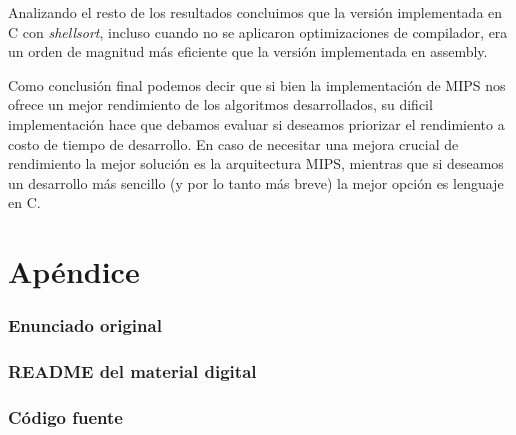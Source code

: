 \documentclass[a4paper,11pt]{article}
\begin{document}
Analizando el resto de los resultados concluimos que la versión implementada en
C con \textit{shellsort}, incluso cuando no se aplicaron optimizaciones de
compilador, era un orden de magnitud más eficiente que la versión implementada
en assembly. 

Como conclusión final podemos decir que si bien la implementación de MIPS nos ofrece un mejor rendimiento de los algoritmos desarrollados, su dificil implementación hace que debamos evaluar si deseamos priorizar el rendimiento a costo de tiempo de desarrollo. En caso de necesitar una mejora crucial de rendimiento la mejor solución es la arquitectura MIPS, mientras que si deseamos un desarrollo más sencillo (y por lo tanto más breve) la mejor opción es lenguaje en C.

\clearpage

\part{Apéndice}
\appendix

\section{Enunciado original}\label{sec:enunciado}


\clearpage
\section{README del material digital}\label{sec:readme}


\clearpage
\section{Código fuente}\label{sec:source}
\clearpage
{}

%
%
\end{document}
